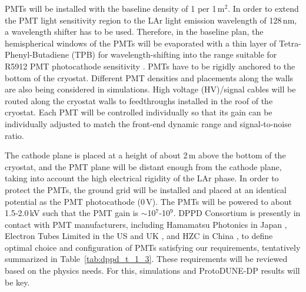 PMTs will be installed with the baseline density of 1 per 1\,m$^2$. In order to extend the PMT light sensitivity region to the LAr light emission wavelength of 128\,nm, a wavelength shifter has to be used. Therefore, in the baseline plan, the hemispherical windows of the PMTs will be evaporated with a thin layer of Tetra-Phenyl-Butadiene (TPB) \cite{tpb} for wavelength-shifting into the range suitable for R5912 PMT photocathode sensitivity \cite{hamamatsu-5912}. PMTs have to be rigidly anchored to the bottom of the cryostat. Different PMT densities and placements along the walls are also being considered in simulations. High voltage (HV)/signal cables will be routed along the cryostat walls to feedthroughs installed in the roof of the cryostat. Each PMT will be controlled individually so that its gain can be individually adjusted to match the front-end dynamic range and signal-to-noise ratio. 

The cathode plane is placed at a height of about 2\,m above the bottom of the cryostat, and the PMT plane will be distant enough from the cathode plane, taking into account the high electrical rigidity of the LAr phase. In order to protect the PMTs, the ground grid will be installed and placed at an identical potential as the PMT photocathode (0\,V). The PMTs will be powered to about 1.5-2.0\,kV such that the PMT gain is $\sim$10$^7$-10$^9$. DPPD Consortium is presently in contact with PMT manufacturers, including Hamamatsu Photonics in Japan \cite{hamamatsu}, Electron Tubes Limited in the US and UK \cite{electrontubeslim}, and HZC in China \cite{hzc}, to define optimal choice and configuration of PMTs satisfying our requirements, tentatively summarized in Table~\ref{tab:dppd_t_1_3}. These requirements will be reviewed based on the physics needs. For this, simulations and ProtoDUNE-DP results will be key.

